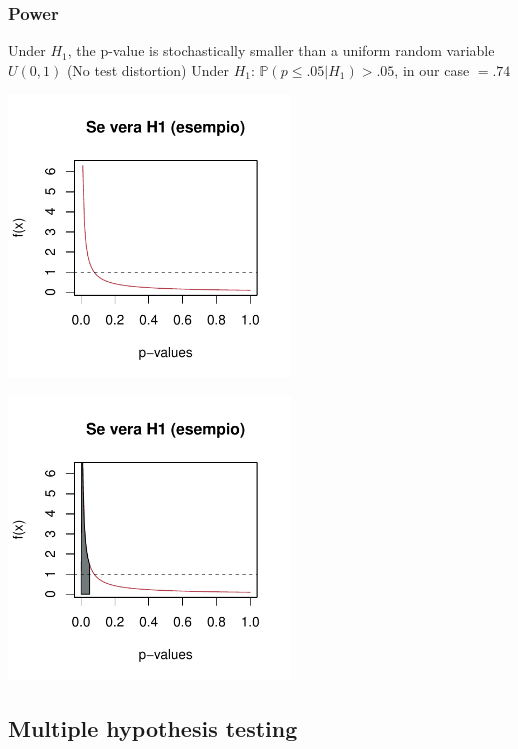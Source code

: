 \documentclass[xcolor={pdftex,dvipsnames,table}]{beamer}
\begin{document}
\begin{frame}
\frametitle{Power}


\begin{overprint}
 {Under $H_1$, the p-value is stochastically smaller than a uniform random variable $U(0,1)$ (No test distortion)}
 {Under $H_1$: $\mathbb{P}(p\leq .05 |H_1)>.05$, in our case $= .74$\\ }
\end{overprint}
\begin{overprint} 
 \centerline{\includegraphics[width=7.5cm]{plaatjes/beta1}}
 \centerline{\includegraphics[width=7.5cm]{plaatjes/beta2}}
\end{overprint} 
\end{frame}

\subsection{Multiple hypothesis testing}
\end{document}

